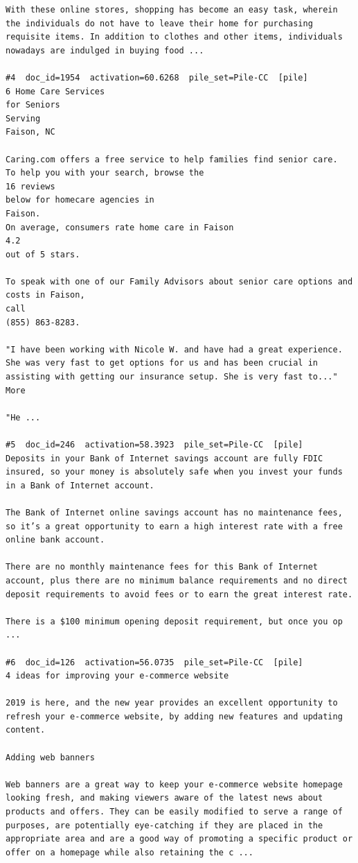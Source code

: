 \begin{verbatim}
With these online stores, shopping has become an easy task, wherein the individuals do not have to leave their home for purchasing requisite items. In addition to clothes and other items, individuals nowadays are indulged in buying food ...

#4  doc_id=1954  activation=60.6268  pile_set=Pile-CC  [pile]
6 Home Care Services
for Seniors
Serving
Faison, NC

Caring.com offers a free service to help families find senior care.
To help you with your search, browse the
16 reviews
below for homecare agencies in
Faison.
On average, consumers rate home care in Faison
4.2
out of 5 stars.

To speak with one of our Family Advisors about senior care options and costs in Faison,
call
(855) 863-8283.

"I have been working with Nicole W. and have had a great experience. She was very fast to get options for us and has been crucial in assisting with getting our insurance setup. She is very fast to..." More

"He ...

#5  doc_id=246  activation=58.3923  pile_set=Pile-CC  [pile]
Deposits in your Bank of Internet savings account are fully FDIC insured, so your money is absolutely safe when you invest your funds in a Bank of Internet account.

The Bank of Internet online savings account has no maintenance fees, so it’s a great opportunity to earn a high interest rate with a free online bank account.

There are no monthly maintenance fees for this Bank of Internet account, plus there are no minimum balance requirements and no direct deposit requirements to avoid fees or to earn the great interest rate.

There is a $100 minimum opening deposit requirement, but once you op ...

#6  doc_id=126  activation=56.0735  pile_set=Pile-CC  [pile]
4 ideas for improving your e-commerce ​website

2019 is here, and the new year provides an excellent opportunity to refresh your e-commerce website, by adding new features and updating content.

Adding web banners

Web banners are a great way to keep your e-commerce website homepage looking fresh, and making viewers aware of the latest news about products and offers. They can be easily modified to serve a range of purposes, are potentially eye-catching if they are placed in the appropriate area and are a good way of promoting a specific product or offer on a homepage while also retaining the c ...


\end{verbatim}
